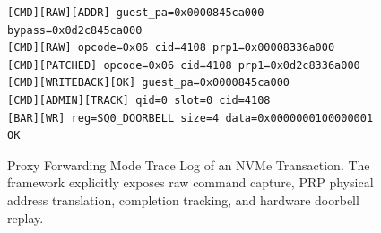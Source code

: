 \documentclass[10pt,conference,letterpaper]{IEEEtran}
\begin{document}
\begin{figure}[htbp]
    \centering
    \scriptsize
    \begin{verbatim}
[CMD][RAW][ADDR] guest_pa=0x0000845ca000 bypass=0x0d2c845ca000
[CMD][RAW] opcode=0x06 cid=4108 prp1=0x00008336a000
[CMD][PATCHED] opcode=0x06 cid=4108 prp1=0x0d2c8336a000
[CMD][WRITEBACK][OK] guest_pa=0x0000845ca000
[CMD][ADMIN][TRACK] qid=0 slot=0 cid=4108
[BAR][WR] reg=SQ0_DOORBELL size=4 data=0x0000000100000001 OK
    \end{verbatim}
    \vspace{-2mm}
    \caption{Proxy Forwarding Mode Trace Log of an NVMe Transaction. The framework explicitly exposes raw command capture, PRP physical address translation, completion tracking, and hardware doorbell replay.}
    \label{fig:observability_log}
\end{figure}

%
%

\end{document}
